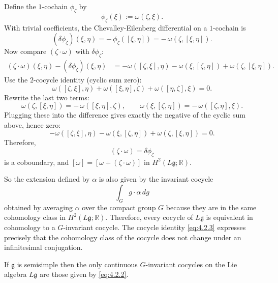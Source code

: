 \documentclass[12pt]{article}
\begin{document}
\begin{remark}
    Define the $1$-cochain $\phi_\zeta$ by
    \[
        \phi_\zeta(\xi) := \omega(\zeta, \xi).
    \]
    With trivial coefficients, the Chevalley-Eilenberg differential on a $1$-cochain is
    \[
        (\delta\phi_\zeta)(\xi, \eta) = -\,\phi_\zeta([\xi, \eta]) = -\,\omega(\zeta, [\xi, \eta]).
    \]
    Now compare $(\zeta\cdot\omega)$ with $\delta\phi_\zeta$:
    \begin{align*}
        (\zeta\cdot\omega)(\xi, \eta) - (\delta\phi_\zeta)(\xi, \eta)
         & = -\omega([\zeta, \xi], \eta) - \omega(\xi, [\zeta, \eta]) + \omega(\zeta, [\xi, \eta]).
    \end{align*}
    Use the $2$-cocycle identity (cyclic sum zero):
    \[
        \omega([\zeta, \xi], \eta) + \omega([\xi, \eta], \zeta) + \omega([\eta, \zeta], \xi) = 0.
    \]
    Rewrite the last two terms:
    \[
        \omega(\zeta, [\xi, \eta]) = -\,\omega([\xi, \eta], \zeta), \qquad
        \omega(\xi, [\zeta, \eta]) = -\,\omega([\zeta, \eta], \xi).
    \]
    Plugging these into the difference gives exactly the negative of the cyclic sum above, hence zero:
    \[
        -\omega([\zeta, \xi], \eta) - \omega(\xi, [\zeta, \eta]) + \omega(\zeta, [\xi, \eta]) = 0.
    \]
    Therefore,
    \[
        (\zeta\cdot\omega) = \delta\phi_\zeta
    \]
    is a coboundary, and $[\omega] = [\omega + (\zeta\cdot\omega)]$ in $H^2(L\mathfrak{g};\mathbb{R})$.
\end{remark}

So the extension defined by $\alpha$ is also given by the invariant cocycle
\[
    \int_G g\cdot \alpha \, dg
\]
obtained by averaging $\alpha$ over the compact group $G$ because they are in the same cohomology class in $H^2(L\mathfrak{g};\mathbb{R})$. Therefore, every cocycle of $L\mathfrak{g}$ is equivalent in cohomology to a $G$-invariant cocycle. The cocycle identity \eqref{eq:4.2.3} expresses precisely that the cohomology class of the cocycle does not change under an infinitesimal conjugation.


\begin{proposition}\label{prop:invariant_cocycles}
    If $\mathfrak{g}$ is semisimple then the only continuous $G$-invariant
    cocycles on the Lie algebra $L\mathfrak{g}$ are those given by
    \eqref{eq:4.2.2}.
\end{proposition}
\end{document}
